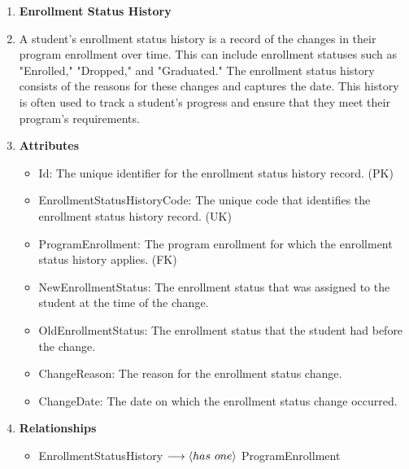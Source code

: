 \documentclass[12pt]{article}
\begin{document}
\begin{appendices}
\begin{enumerate}[label=(\roman*)]
    \item \textbf{Enrollment Status History}
    \item[] A student's enrollment status history is a record of the changes in their program enrollment over time. This can include enrollment statuses such as "Enrolled," "Dropped," and "Graduated." The enrollment status history consists of the reasons for these changes and captures the date. This history is often used to track a student's progress and ensure that they meet their program's requirements.
    \item[] \textbf{Attributes}
    \begin{itemize}
        \item Id: The unique identifier for the enrollment status history record. (PK)
        \item EnrollmentStatusHistoryCode: The unique code that identifies the enrollment status history record. (UK)
        \item ProgramEnrollment: The program enrollment for which the enrollment status history applies. (FK)
        \item NewEnrollmentStatus: The enrollment status that was assigned to the student at the time of the change.
        \item OldEnrollmentStatus: The enrollment status that the student had before the change.
        \item ChangeReason: The reason for the enrollment status change.
        \item ChangeDate: The date on which the enrollment status change occurred.        
    \end{itemize}
    \item[] \textbf{Relationships}
    \begin{itemize}
        \item EnrollmentStatusHistory $ \longrightarrow \langle has \hspace{0.125cm} one \rangle $ ProgramEnrollment
    \end{itemize}


\end{enumerate}
\end{appendices}
\end{document}
